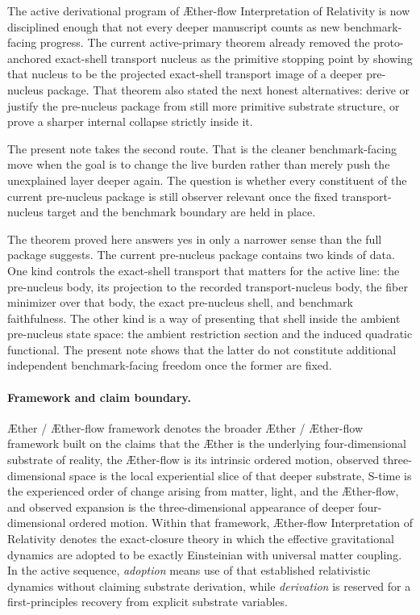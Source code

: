 \documentclass[11pt]{article}
\newcommand{\Aether}{\AE{}ther}
\newcommand{\Aflow}{\AE{}ther-flow}
\newcommand{\TheoryName}{\Aflow{} Interpretation of Relativity}
\newcommand{\TheoryProgram}{\Aether{} / \Aflow{} framework}
\begin{document}
The active derivational program of \TheoryName{} is now disciplined enough that not every deeper manuscript counts as new benchmark-facing progress. The current active-primary theorem already removed the proto-anchored exact-shell transport nucleus as the primitive stopping point by showing that nucleus to be the projected exact-shell transport image of a deeper pre-nucleus package. That theorem also stated the next honest alternatives: derive or justify the pre-nucleus package from still more primitive substrate structure, or prove a sharper internal collapse strictly inside it.

The present note takes the second route. That is the cleaner benchmark-facing move when the goal is to change the live burden rather than merely push the unexplained layer deeper again. The question is whether every constituent of the current pre-nucleus package is still observer relevant once the fixed transport-nucleus target and the benchmark boundary are held in place.

The theorem proved here answers yes in only a narrower sense than the full package suggests. The current pre-nucleus package contains two kinds of data. One kind controls the exact-shell transport that matters for the active line: the pre-nucleus body, its projection to the recorded transport-nucleus body, the fiber minimizer over that body, the exact pre-nucleus shell, and benchmark faithfulness. The other kind is a way of presenting that shell inside the ambient pre-nucleus state space: the ambient restriction section and the induced quadratic functional. The present note shows that the latter do not constitute additional independent benchmark-facing freedom once the former are fixed.

\paragraph{Framework and claim boundary.}
\TheoryProgram{} denotes the broader \Aether{} / \Aflow{} framework built on the claims that the \Aether{} is the underlying four-dimensional substrate of reality, the \Aflow{} is its intrinsic ordered motion, observed three-dimensional space is the local experiential slice of that deeper substrate, S-time is the experienced order of change arising from matter, light, and the \Aflow{}, and observed expansion is the three-dimensional appearance of deeper four-dimensional ordered motion. Within that framework, \TheoryName{} denotes the exact-closure theory in which the effective gravitational dynamics are adopted to be exactly Einsteinian with universal matter coupling. In the active sequence, \emph{adoption} means use of that established relativistic dynamics without claiming substrate derivation, while \emph{derivation} is reserved for a first-principles recovery from explicit substrate variables.
\end{document}
